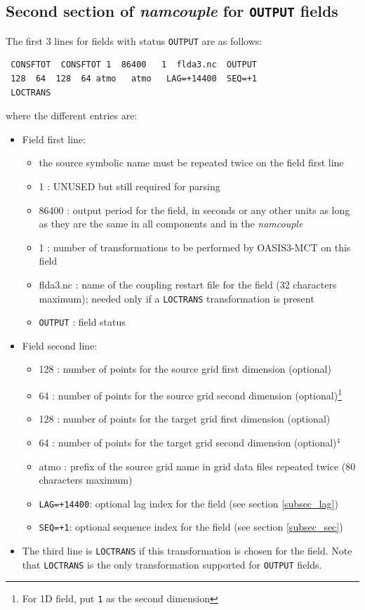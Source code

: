 \subsection{Second section of {\it namcouple} for {\tt OUTPUT} fields}
\label{subsubsec_secondOUTPUT}
The first 3 lines for fields with status {\tt OUTPUT} are as follows:
  \begin{verbatim}
 CONSFTOT  CONSFTOT 1  86400   1  flda3.nc  OUTPUT
 128  64  128  64 atmo   atmo   LAG=+14400  SEQ=+1 
 LOCTRANS
\end{verbatim}
where the different entries are:
\begin{itemize}
  \item Field first line:
    \begin{itemize}
    \item the source symbolic name must be repeated twice on the field
      first line
    \item 1 : UNUSED but still required for parsing
    \item 86400 : output period for the field, in seconds or any other units as long as they are the same in all components and in the {\it namcouple}
    \item 1 : number of transformations to be performed by OASIS3-MCT
      on this field
    \item flda3.nc : name of the coupling restart file for the field
      (32 characters maximum); needed only if  a {\tt LOCTRANS} transformation is present
    \item {\tt OUTPUT} : field status
    \end{itemize}
  \item Field second line:
    \begin{itemize}
    \item 128 : number of points for the source grid first dimension (optional)
    \item 64 : number of points for the source grid second dimension (optional)\footnote{For 1D field, put {\tt 1} as the second dimension}
    \item 128 : number of points for the target grid first dimension (optional)
    \item 64 : number of points for the target grid second dimension (optional)$^{4}$
    \item atmo : prefix of the source grid name in grid data files repeated twice (80 characters maximum)
    \item {\tt LAG=+14400}: optional lag index for the field (see section \ref{subsec_lag})
    \item {\tt SEQ=+1}: optional sequence index for the field (see
    section \ref{subsec_sec})
    \end{itemize}
  \item The third line is {\tt LOCTRANS} if this transformation is chosen for
the field. Note that {\tt LOCTRANS} is the only transformation
supported for {\tt OUTPUT} fields.
\end{itemize}

